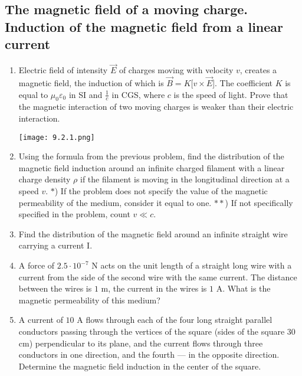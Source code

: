 \documentclass{article}
\begin{document}
\subsection{The magnetic field of a moving charge. Induction of the magnetic field from a linear current}

\begin{enumerate}[label=9.2.\arabic*]

\item Electric field of intensity $\overrightarrow{E}$ of charges moving with velocity $v$, creates a magnetic field, the induction of which is $\overrightarrow{B} = K$[$v \times \overrightarrow{E} $]. The coefficient $K$ is equal to $\mu_0 \varepsilon_0$ in SI and $\frac{1}{c}$ in CGS, where $c$ is the speed of light. Prove that the magnetic interaction of two moving charges is weaker than their electric interaction.

\begin{center}
    \texttt{[image: 9.2.1.png]}
\end{center}


\item Using the formula from the previous problem, find the distribution of the magnetic field induction around an infinite charged filament with a linear charge density $\rho$ if the filament is moving in the longitudinal direction at a speed $v$. $\ast$) If the problem does not specify the value of the magnetic permeability of the medium, consider it equal to one.
$\ast \ast$) If not specifically specified in the problem, count $v \ll c$.

\item Find the distribution of the magnetic field around an infinite straight wire carrying a current I.

\item A force of $2.5 \cdot 10^{-7}$ N acts on the unit length of a straight long wire with a current from the side of the second wire with the same current. The distance between the wires is $1$ m, the current in the wires is $1$ A. What is the magnetic permeability of this medium?

\item A current of $10$ A flows through each of the four long straight parallel conductors passing through the vertices of the square (sides of the square $30$ cm) perpendicular to its plane, and the current flows through three conductors in one direction, and the fourth — in the opposite direction. Determine the magnetic field induction in the center of the square.


\end{enumerate}
\end{document}
